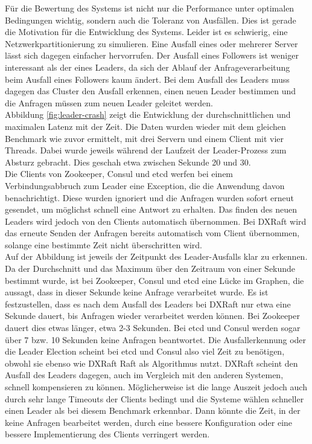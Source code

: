 Für die Bewertung des Systems ist nicht nur die Performance unter optimalen Bedingungen wichtig, sondern auch die Toleranz von Ausfällen. Dies ist gerade die Motivation für die Entwicklung des Systems. Leider ist es schwierig, eine Netzwerkpartitionierung zu simulieren. Eine Ausfall eines oder mehrerer Server lässt sich dagegen einfacher hervorrufen. Der Ausfall eines Followers ist weniger interessant als der eines Leaders, da sich der Ablauf der Anfrageverarbeitung beim Ausfall eines Followers kaum ändert. Bei dem Ausfall des Leaders muss dagegen das Cluster den Ausfall erkennen, einen neuen Leader bestimmen und die Anfragen müssen zum neuen Leader geleitet werden. \\
Abbildung \ref{fig:leader-crash} zeigt die Entwicklung der durchschnittlichen und maximalen Latenz mit der Zeit. Die Daten wurden wieder mit dem gleichen Benchmark wie zuvor ermittelt, mit drei Servern und einem Client mit vier Threads. Dabei wurde jeweils während der Laufzeit der Leader-Prozess zum Absturz gebracht. Dies geschah etwa zwischen Sekunde 20 und 30. \\
Die Clients von Zookeeper, Consul und etcd werfen bei einem Verbindungsabbruch zum Leader eine Exception, die die Anwendung davon benachrichtigt. Diese wurden ignoriert und die Anfragen wurden sofort erneut gesendet, um möglichst schnell eine Antwort zu erhalten. Das finden des neuen Leaders wird jedoch von den Clients automatisch übernommen. Bei DXRaft wird das erneute Senden der Anfragen bereits automatisch vom Client übernommen, solange eine bestimmte Zeit nicht überschritten wird. \\
Auf der Abbildung ist jeweils der Zeitpunkt des Leader-Ausfalls klar zu erkennen. Da der Durchschnitt und das Maximum über den Zeitraum von einer Sekunde bestimmt wurde, ist bei Zookeeper, Consul und etcd eine Lücke im Graphen, die aussagt, dass in dieser Sekunde keine Anfrage verarbeitet wurde. Es ist festzustellen, dass es nach dem Ausfall des Leaders bei DXRaft nur etwa eine Sekunde dauert, bis Anfragen wieder verarbeitet werden können. Bei Zookeeper dauert dies etwas länger, etwa 2-3 Sekunden. Bei etcd und Consul werden sogar über 7 bzw. 10 Sekunden keine Anfragen beantwortet. Die Ausfallerkennung oder die Leader Election scheint bei etcd und Consul also viel Zeit zu benötigen, obwohl sie ebenso wie DXRaft Raft als Algorithmus nutzt. DXRaft scheint den Ausfall des Leaders dagegen, auch im Vergleich mit den anderen Systemen, schnell kompensieren zu können. Möglicherweise ist die lange Auszeit jedoch auch durch sehr lange Timeouts der Clients bedingt und die Systeme wählen schneller einen Leader als bei diesem Benchmark erkennbar. Dann könnte die Zeit, in der keine Anfragen bearbeitet werden, durch eine bessere Konfiguration oder eine bessere Implementierung des Clients verringert werden.\\
